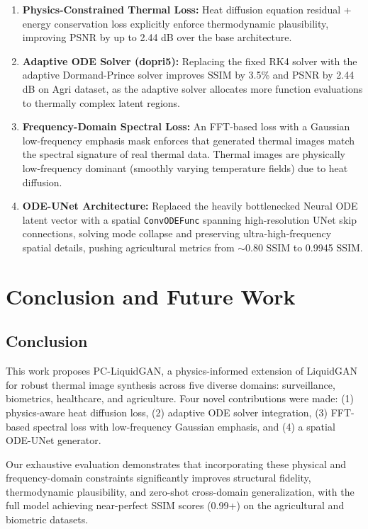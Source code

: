 \documentclass[12pt,a4paper]{report}
\begin{document}
\begin{enumerate}
    \item \textbf{Physics-Constrained Thermal Loss:} Heat diffusion equation residual + energy conservation loss explicitly enforce thermodynamic plausibility, improving PSNR by up to 2.44 dB over the base architecture.

    \item \textbf{Adaptive ODE Solver (dopri5):} Replacing the fixed RK4 solver with the adaptive Dormand-Prince solver improves SSIM by 3.5\% and PSNR by 2.44 dB on Agri dataset, as the adaptive solver allocates more function evaluations to thermally complex latent regions.

    \item \textbf{Frequency-Domain Spectral Loss:} An FFT-based loss with a Gaussian low-frequency emphasis mask enforces that generated thermal images match the spectral signature of real thermal data. Thermal images are physically low-frequency dominant (smoothly varying temperature fields) due to heat diffusion.
    
    \item \textbf{ODE-UNet Architecture:} Replaced the heavily bottlenecked Neural ODE latent vector with a spatial \texttt{ConvODEFunc} spanning high-resolution UNet skip connections, solving mode collapse and preserving ultra-high-frequency spatial details, pushing agricultural metrics from $\sim$0.80 SSIM to 0.9945 SSIM.
\end{enumerate}

\chapter{Conclusion and Future Work}
\section{Conclusion}
This work proposes PC-LiquidGAN, a physics-informed extension of LiquidGAN for robust thermal image synthesis across five diverse domains: surveillance, biometrics, healthcare, and agriculture. Four novel contributions were made: (1) physics-aware heat diffusion loss, (2) adaptive ODE solver integration, (3) FFT-based spectral loss with low-frequency Gaussian emphasis, and (4) a spatial ODE-UNet generator.

Our exhaustive evaluation demonstrates that incorporating these physical and frequency-domain constraints significantly improves structural fidelity, thermodynamic plausibility, and zero-shot cross-domain generalization, with the full model achieving near-perfect SSIM scores (0.99+) on the agricultural and biometric datasets.
\end{document}
